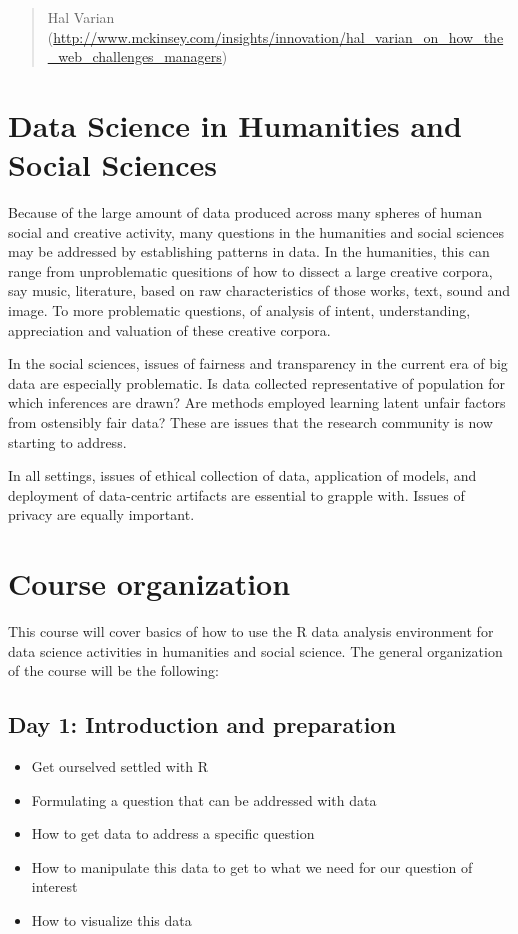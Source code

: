 \documentclass[12pt,]{book}
\providecommand{\tightlist}{%
  \setlength{\itemsep}{0pt}\setlength{\parskip}{0pt}}
\theoremstyle{definition}
\theoremstyle{definition}
\theoremstyle{definition}
\theoremstyle{remark}
\begin{document}
\begin{quote}
Hal Varian
(\url{http://www.mckinsey.com/insights/innovation/hal_varian_on_how_the_web_challenges_managers})
\end{quote}

\section{Data Science in Humanities and Social
Sciences}\label{data-science-in-humanities-and-social-sciences}

Because of the large amount of data produced across many spheres of
human social and creative activity, many questions in the humanities and
social sciences may be addressed by establishing patterns in data. In
the humanities, this can range from unproblematic quesitions of how to
dissect a large creative corpora, say music, literature, based on raw
characteristics of those works, text, sound and image. To more
problematic questions, of analysis of intent, understanding,
appreciation and valuation of these creative corpora.

In the social sciences, issues of fairness and transparency in the
current era of big data are especially problematic. Is data collected
representative of population for which inferences are drawn? Are methods
employed learning latent unfair factors from ostensibly fair data? These
are issues that the research community is now starting to address.

In all settings, issues of ethical collection of data, application of
models, and deployment of data-centric artifacts are essential to
grapple with. Issues of privacy are equally important.

\section{Course organization}\label{course-organization}

This course will cover basics of how to use the R data analysis
environment for data science activities in humanities and social
science. The general organization of the course will be the following:

\subsection{Day 1: Introduction and
preparation}\label{day-1-introduction-and-preparation}

\begin{itemize}
\tightlist
\item
  Get ourselved settled with R
\item
  Formulating a question that can be addressed with data
\item
  How to get data to address a specific question
\item
  How to manipulate this data to get to what we need for our question of
  interest
\item
  How to visualize this data
\end{itemize}
\end{document}
